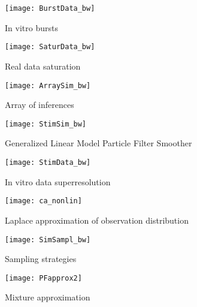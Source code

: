 \documentclass[10pt]{article}
\begin{document}
\clearpage \newpage
\begin{figure}
\texttt{[image: BurstData\_bw]}
\caption{In vitro bursts} \label{fig:BurstData}
\end{figure}

\clearpage \newpage
\begin{figure}
\texttt{[image: SaturData\_bw]}
\caption{Real data saturation} \label{fig:SaturData}
\end{figure}

\clearpage \newpage
\begin{figure}
\texttt{[image: ArraySim\_bw]}
\caption{Array of inferences} \label{fig:array}
\end{figure}

\clearpage \newpage
\begin{figure}
\begin{centering}
\texttt{[image: StimSim\_bw]}
\end{centering}
\caption{Generalized Linear Model Particle Filter Smoother} \label{fig:StimSim}
\end{figure}

\clearpage \newpage
\begin{figure}
\texttt{[image: StimData\_bw]}
\caption{In vitro data superresolution} \label{fig:real}
\end{figure}

\clearpage \newpage
\begin{figure}
\texttt{[image: ca\_nonlin]}
\caption{Laplace approximation of observation distribution} \label{fig:ca_nonlin}
\end{figure}

\clearpage \newpage
\begin{figure}
\centering \texttt{[image: SimSampl\_bw]}
\caption{Sampling strategies} \label{fig:sampl}
\end{figure}

\clearpage \newpage
\begin{figure}
\centering
\texttt{[image: PFapprox2]}
\caption{Mixture approximation} \label{fig:pf2}
\end{figure}
\end{document}

